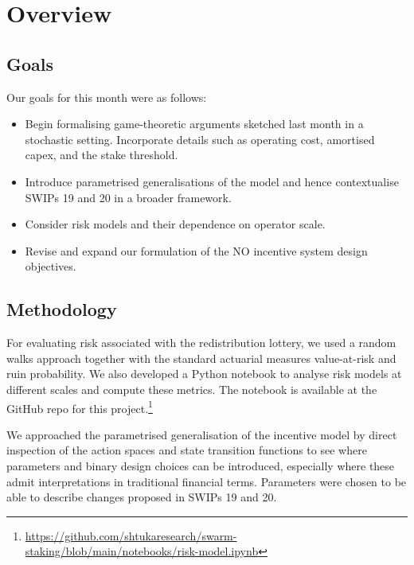 \maketitle
\section*{Overview}

\subsection*{Goals}

Our goals for this month were as follows: 

\begin{itemize}
  \item 
    Begin formalising game-theoretic arguments sketched last month in a stochastic setting.
    Incorporate details such as operating cost, amortised capex, and the stake threshold.
  \item
    Introduce parametrised generalisations of the model and hence contextualise SWIPs 19 and 20 in a broader framework.
  \item 
    Consider risk models and their dependence on operator scale.
  \item
    Revise and expand our formulation of the NO incentive system design objectives.
\end{itemize}

\subsection*{Methodology}

For evaluating risk associated with the redistribution lottery, we used a random walks approach together with the standard actuarial measures value-at-risk and ruin probability.
%
We also developed a Python notebook to analyse risk models at different scales and compute these metrics. The notebook is available at the GitHub repo for this project.\footnote{\url{https://github.com/shtukaresearch/swarm-staking/blob/main/notebooks/risk-model.ipynb}}

We approached the parametrised generalisation of the incentive model by direct inspection of the action spaces and state transition functions to see where parameters and binary design choices can be introduced, especially where these admit interpretations in traditional financial terms. 
%
Parameters were chosen to be able to describe changes proposed in SWIPs 19 and 20.


